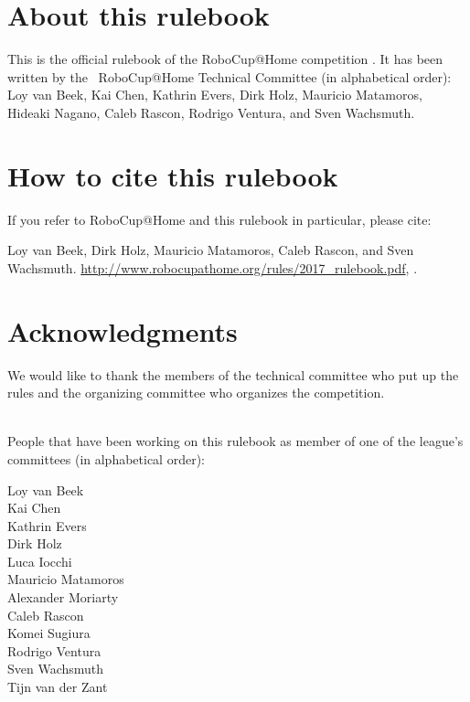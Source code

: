 


\section*{About this rulebook}
This is the official rulebook of the RoboCup@Home competition \YEAR.
It has been written by the \YEAR ~RoboCup@Home Technical Committee (in alphabetical order): 
Loy van Beek,
Kai Chen,
Kathrin Evers,
Dirk Holz,
Mauricio Matamoros, 
Hideaki Nagano,
Caleb Rascon,
Rodrigo Ventura, and 
Sven Wachsmuth.

\section*{How to cite this rulebook}
If you refer to RoboCup@Home and this rulebook in particular, please cite:

Loy van Beek, Dirk Holz, Mauricio Matamoros, Caleb Rascon, and Sven Wachsmuth. 
\url{http://www.robocupathome.org/rules/2017_rulebook.pdf}, \YEAR.



\section*{Acknowledgments}
\label{sec:acknowledgments}
We would like to thank the members of the technical committee who put up the rules and the organizing committee who organizes the competition.  

~\\\noindent People that have been working on this rulebook as member of one of the league's committees (in alphabetical order):
\begin{multicols}{3}%
\noindent%
Loy van Beek\\
Kai Chen\\
Kathrin Evers\\\columnbreak
Dirk Holz\\
Luca Iocchi\\
Mauricio Matamoros\\
Alexander Moriarty\\\columnbreak
Caleb Rascon\\
Komei Sugiura\\
Rodrigo Ventura\\
Sven Wachsmuth\\
Tijn van der Zant\\
\end{multicols}

